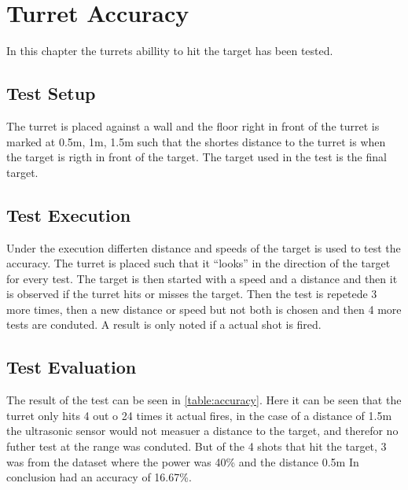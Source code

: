 \chapter{Turret Accuracy}
In this chapter the turrets abillity to hit the target has been tested.

\section{Test Setup}
The turret is placed against a wall and the floor right in front of the turret
is marked at 0.5m, 1m, 1.5m such that the shortes distance to the turret is when
the target is rigth in front of the target. The target used in the test is the final
target.

\section{Test Execution}
Under the execution differten distance and speeds of the target is used to test
the accuracy. The turret is placed such that it ``looks'' in the direction of
the target for every test. The target is then started with a speed and a
distance and then it is observed if the turret hits or misses the target. Then
the test is repetede 3 more times, then a new distance or speed but not both is
chosen and then 4 more tests are conduted. A result is only noted if a actual
shot is fired. 

\section{Test Evaluation}
The result of the test can be seen in \autoref{table:accuracy}. Here it can be
seen that the turret only hits 4 out o 24 times it actual fires, in the case of
a distance of 1.5m the ultrasonic sensor would not measuer a distance to the
target, and therefor no futher test at the range was conduted. But of the 4
shots that hit the target, 3 was from the dataset where the power was 40\% and
the distance 0.5m  In conclusion \names  had an accuracy of 16.67\%.

